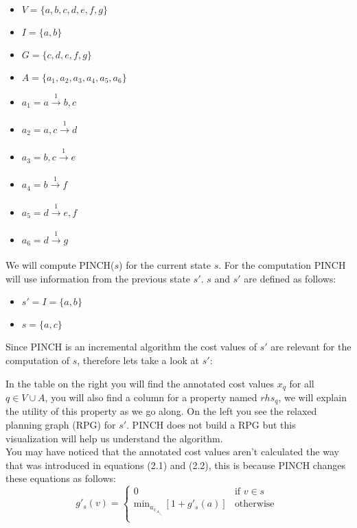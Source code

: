 \begin{center}
\begin{multicols}{2}
\begin{itemize}
\setlength\itemsep{0em}
\item $V = \{a,b,c,d,e,f,g\}$
\item $I = \{a,b\}$
\item $G = \{c,d,e,f,g\}$ 
\item $A = \{a_1,a_2,a_3,a_4,a_5,a_6\}$
\item $a_1 = a \xrightarrow[\text{}]{\text{1}} b,c$
\item $a_2 = a,c \xrightarrow[\text{}]{\text{1}} d$
\item $a_3 = b,c \xrightarrow[\text{}]{\text{1}} e$
\item $a_4 = b \xrightarrow[\text{}]{\text{1}} f$
\item $a_5 = d \xrightarrow[\text{}]{\text{1}} e,f$
\item $a_6 = d \xrightarrow[\text{}]{\text{1}} g$
\end{itemize}
\end{multicols}
\end{center}
We will compute PINCH($s$) for the current state $s$. For the computation PINCH will use information from the previous state $s'$. $s$ and $s'$ are defined as follows: 
\begin{center}
\begin{multicols}{2}
\begin{itemize}
\setlength\itemsep{0em}
\item $s' = I = \{a,b\}$
\item $s = \{a,c\}$
\end{itemize}
\end{multicols}
\end{center}
Since PINCH is an incremental algorithm the cost values of $s'$ are relevant for the computation of $s$, therefore lets take a look at $s'$:

In the table on the right you will find the annotated cost values $x_q$ for all $q \in V \cup A$, you will also find a column for a property named $rhs_q$, we will explain the utility of this property as we go along. On the left you see the relaxed planning graph (RPG) for $s'$. PINCH does not build a RPG but this visualization will help us understand the algorithm.\\

You may have noticed that the annotated cost values aren't calculated the way that was introduced in equations (2.1) and (2.2), this is because PINCH changes these equations as follows:
\newpage
\begin{equation}
 g'_s(v) = 
  \begin{cases} 
   0 & \text{if } v \in s \\
   \text{min}_a_\in_A_|_v_\in_a_d_d_(_a_) [1 + g'_s(a)]       & \text{otherwise } 
  \end{cases}
\end{equation}

